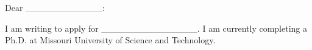 Dear ____________:

I am writing to apply for _______________. I am currently completing a Ph.D. at Missouri University of Science and Technology. 






%	
